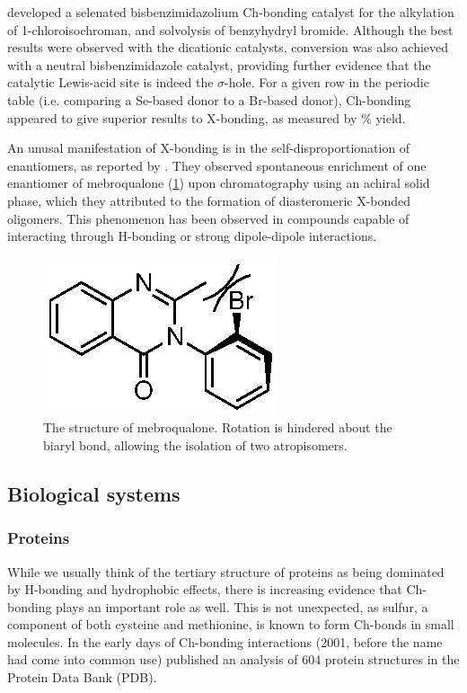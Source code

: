 \begin{refsection}
\citeauthor{Wonner2017} developed a selenated bisbenzimidazolium Ch-bonding catalyst for the alkylation of 1-chloroisochroman, and solvolysis of benzyhydryl bromide.\autocite{Wonner2017,Wonner2017a}
Although the best results were observed with the dicationic catalysts, conversion was also achieved with a neutral bisbenzimidazole catalyst, providing further evidence that the catalytic Lewis-acid site is indeed the $\sigma$-hole.
For a given row in the periodic table (i.e. comparing a Se-based donor to a Br-based donor), Ch-bonding appeared to give superior results to X-bonding, as measured by \% yield.

An unusal manifestation of X-bonding is in the self-disproportionation of enantiomers, as reported by \citeauthor{Soloshonok2017}.\autocite{Soloshonok2017}
They observed spontaneous enrichment of one enantiomer of mebroqualone (\cref{fig:mebroqualone}) upon chromatography using an achiral solid phase, which they attributed to the formation of diasteromeric X-bonded oligomers.
This phenomenon has been observed in compounds capable of interacting through H-bonding or strong dipole-dipole interactions.\autocite{Cundy1983}

\begin{figure}
    \centering
    \includegraphics[scale=0.8]{Figures/mebroqualone.eps}
    \caption[The structure of mebroqualone.]{The structure of mebroqualone. Rotation is hindered about the biaryl bond, allowing the isolation of two atropisomers.}
    \label{fig:mebroqualone}
\end{figure}

\subsection{Biological systems}

\subsubsection{Proteins}
While we usually think of the tertiary structure of proteins as being dominated by H-bonding and hydrophobic effects, there is increasing evidence that Ch-bonding plays an important role as well.
This is not unexpected, as sulfur, a component of both cysteine and methionine, is known to form Ch-bonds in small molecules.
In the early days of Ch-bonding interactions (2001, before the name had come into common use) \citeauthor{Iwaoka2001} published an analysis of 604 protein structures in the Protein Data Bank (PDB).\autocite{Iwaoka2001}


\end{refsection}

